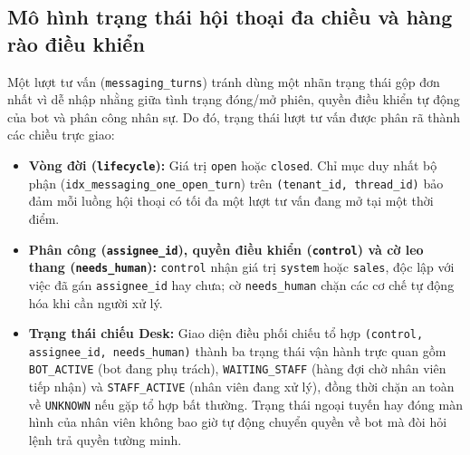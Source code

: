 \subsection{Mô hình trạng thái hội thoại đa chiều và hàng rào điều khiển}
Một lượt tư vấn (\texttt{messaging\_\hspace{0pt}turns}) tránh dùng một nhãn trạng thái gộp đơn nhất vì dễ nhập nhằng giữa tình trạng đóng/mở phiên, quyền điều khiển tự động của bot và phân công nhân sự. Do
đó, trạng thái lượt tư vấn được phân rã thành các chiều trực giao:
\begin{itemize}
  \item \textbf{Vòng đời (\texttt{lifecycle}):} Giá trị \texttt{open} hoặc \texttt{closed}. Chỉ mục duy nhất bộ phận (\texttt{idx\_\hspace{0pt}messaging\_\hspace{0pt}one\_\hspace{0pt}open\_\hspace{0pt}turn}) trên \texttt{(tenant\_\hspace{0pt}id,
    thread\_\hspace{0pt}id)} bảo đảm mỗi luồng hội thoại có tối đa một lượt tư vấn đang mở tại một thời điểm.
  \item \textbf{Phân công (\texttt{assignee\_\hspace{0pt}id}), quyền điều khiển (\texttt{control}) và cờ leo thang (\texttt{needs\_\hspace{0pt}human}):} \texttt{control} nhận giá trị \texttt{system} hoặc \texttt{sales},
    độc lập với việc đã gán \texttt{assignee\_\hspace{0pt}id} hay chưa; cờ \texttt{needs\_\hspace{0pt}human} chặn các cơ chế tự động hóa khi cần người xử lý.
  \item \textbf{Trạng thái chiếu Desk:} Giao diện điều phối chiếu tổ hợp \texttt{(control, assignee\_\hspace{0pt}id, needs\_\hspace{0pt}human)} thành ba trạng thái vận hành trực quan gồm \texttt{BOT\_\hspace{0pt}ACTIVE} (bot đang
    phụ trách), \texttt{WAITING\_\hspace{0pt}STAFF} (hàng đợi chờ nhân viên tiếp nhận) và \texttt{STAFF\_\hspace{0pt}ACTIVE} (nhân viên đang xử lý), đồng thời chặn an toàn về \texttt{UNKNOWN} nếu gặp tổ hợp bất thường.
    Trạng thái ngoại tuyến hay đóng màn hình của nhân viên không bao giờ tự động chuyển quyền về bot mà đòi hỏi lệnh trả quyền tường minh.
\end{itemize}

